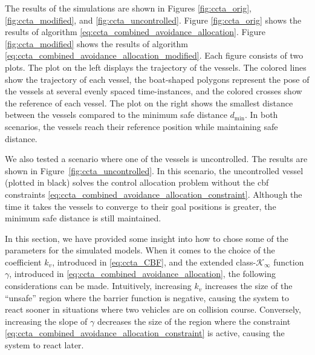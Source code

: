The results of the simulations are shown in Figures \ref{fig:ccta_orig}, \ref{fig:ccta_modified}, and \ref{fig:ccta_uncontrolled}.
Figure \ref{fig:ccta_orig} shows the results of algorithm \eqref{eq:ccta_combined_avoidance_allocation}.
Figure \ref{fig:ccta_modified} shows the results of algorithm \eqref{eq:ccta_combined_avoidance_allocation_modified}.
Each figure consists of two plots.
The plot on the left displays the trajectory of the vessels.
The colored lines show the trajectory of each vessel, the boat-shaped polygons represent the pose of the vessels at several evenly spaced time-instances, and the colored crosses show the reference of each vessel.
The plot on the right shows the smallest distance between the vessels compared to the minimum safe distance $d_{\min}$.
In both scenarios, the vessels reach their reference position while maintaining safe distance.

We also tested a scenario where one of the vessels is uncontrolled.
The results are shown in Figure~\ref{fig:ccta_uncontrolled}.
In this scenario, the uncontrolled vessel (plotted in black) solves the control allocation problem without the \gls{cbf} constraints \eqref{eq:ccta_combined_avoidance_allocation_constraint}.
Although the time it takes the vessels to converge to their goal positions is greater, the minimum safe distance is still maintained.

In this section, we have provided some insight into how to chose some of the parameters for the simulated models.
When it comes to the choice of the coefficient $k_v$, introduced in \eqref{eq:ccta_CBF}, and the extended class-$\mathcal{K}_{\infty}$ function $\gamma$, introduced in \eqref{eq:ccta_combined_avoidance_allocation}, the following considerations can be made.
Intuitively, increasing $k_v$ increases the size of the ``unsafe'' region where the barrier function is negative, causing the system to react sooner in situations where two vehicles are on collision course.
Conversely, increasing the slope of $\gamma$ decreases the size of the region where the constraint \eqref{eq:ccta_combined_avoidance_allocation_constraint} is active, causing the system to react later.

